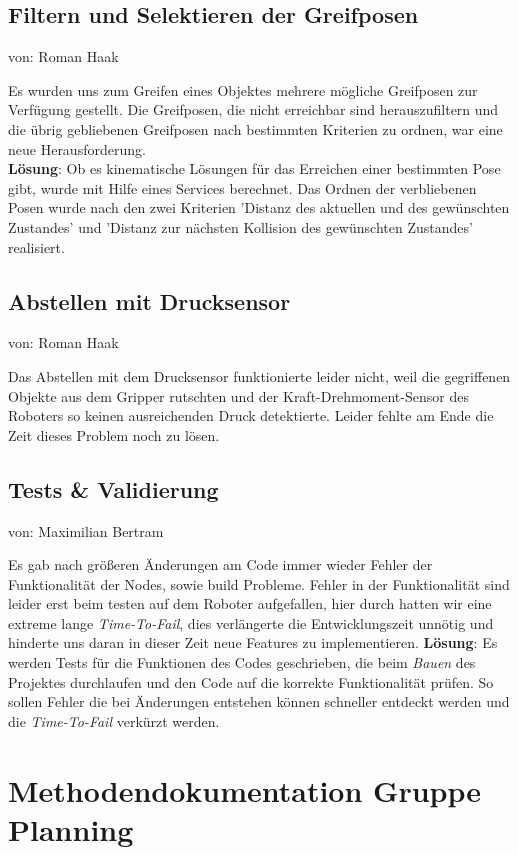 \documentclass{suturo}
\makeatletter
\newcommand{\chapterauthor}[1]{%
  {\parindent0pt\vspace*{-27pt}%
  \linespread{0}\small\begin{flushright}von: #1\end{flushright}%
  \par\nobreak\vspace*{0pt}}
  \@afterheading%
}
\makeatother
\begin{document}
\subsection{Filtern und Selektieren der Greifposen}
\chapterauthor{Roman Haak}
Es wurden uns zum Greifen eines Objektes mehrere mögliche Greifposen zur Verfügung gestellt. Die Greifposen, die nicht erreichbar sind herauszufiltern und die übrig gebliebenen Greifposen nach bestimmten Kriterien zu ordnen, war eine neue Herausforderung.\\
\textbf{Lösung}: Ob es kinematische Lösungen für das Erreichen einer bestimmten Pose gibt, wurde mit Hilfe eines Services berechnet. Das Ordnen der verbliebenen Posen wurde nach den zwei Kriterien 'Distanz des aktuellen und des gewünschten Zustandes' und 'Distanz zur nächsten Kollision des gewünschten Zustandes' realisiert.

\subsection{Abstellen mit Drucksensor}
\chapterauthor{Roman Haak}
Das Abstellen mit dem Drucksensor funktionierte leider nicht, weil die gegriffenen Objekte aus dem Gripper rutschten und der Kraft-Drehmoment-Sensor des Roboters so keinen ausreichenden Druck detektierte. Leider fehlte am Ende die Zeit dieses Problem noch zu lösen.

\subsection{Tests \& Validierung}
\chapterauthor{Maximilian Bertram}
Es gab nach größeren Änderungen am Code immer wieder Fehler der Funktionalität der Nodes, sowie build Probleme.
Fehler in der Funktionalität sind leider erst beim testen auf dem Roboter aufgefallen, hier durch hatten wir eine extreme lange \textit{Time-To-Fail}, dies verlängerte die Entwicklungszeit unnötig und hinderte uns daran in dieser Zeit neue Features zu implementieren.
\textbf{Lösung}: Es werden Tests für die Funktionen des Codes geschrieben, die beim \textit{Bauen} des Projektes durchlaufen und den Code auf die korrekte Funktionalität prüfen. So sollen Fehler die bei Änderungen entstehen können schneller entdeckt werden und die \textit{Time-To-Fail} verkürzt werden.

\section*{Methodendokumentation Gruppe Planning}
\end{document}
